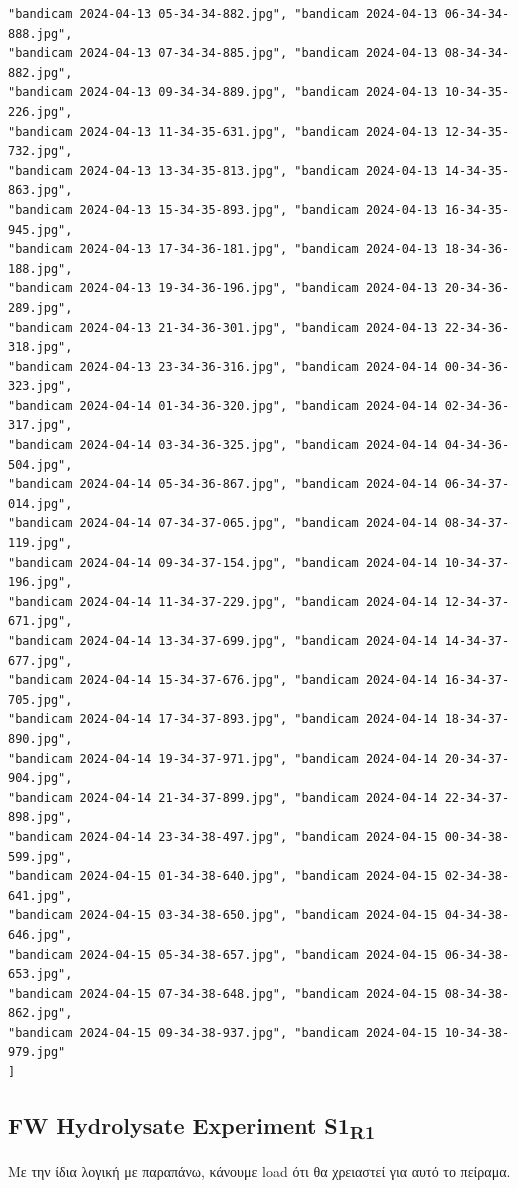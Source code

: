 \documentclass[11pt]{article}
\begin{document}
\begin{verbatim}
"bandicam 2024-04-13 05-34-34-882.jpg", "bandicam 2024-04-13 06-34-34-888.jpg",
"bandicam 2024-04-13 07-34-34-885.jpg", "bandicam 2024-04-13 08-34-34-882.jpg",
"bandicam 2024-04-13 09-34-34-889.jpg", "bandicam 2024-04-13 10-34-35-226.jpg",
"bandicam 2024-04-13 11-34-35-631.jpg", "bandicam 2024-04-13 12-34-35-732.jpg",
"bandicam 2024-04-13 13-34-35-813.jpg", "bandicam 2024-04-13 14-34-35-863.jpg",
"bandicam 2024-04-13 15-34-35-893.jpg", "bandicam 2024-04-13 16-34-35-945.jpg",
"bandicam 2024-04-13 17-34-36-181.jpg", "bandicam 2024-04-13 18-34-36-188.jpg",
"bandicam 2024-04-13 19-34-36-196.jpg", "bandicam 2024-04-13 20-34-36-289.jpg",
"bandicam 2024-04-13 21-34-36-301.jpg", "bandicam 2024-04-13 22-34-36-318.jpg",
"bandicam 2024-04-13 23-34-36-316.jpg", "bandicam 2024-04-14 00-34-36-323.jpg",
"bandicam 2024-04-14 01-34-36-320.jpg", "bandicam 2024-04-14 02-34-36-317.jpg",
"bandicam 2024-04-14 03-34-36-325.jpg", "bandicam 2024-04-14 04-34-36-504.jpg",
"bandicam 2024-04-14 05-34-36-867.jpg", "bandicam 2024-04-14 06-34-37-014.jpg",
"bandicam 2024-04-14 07-34-37-065.jpg", "bandicam 2024-04-14 08-34-37-119.jpg",
"bandicam 2024-04-14 09-34-37-154.jpg", "bandicam 2024-04-14 10-34-37-196.jpg",
"bandicam 2024-04-14 11-34-37-229.jpg", "bandicam 2024-04-14 12-34-37-671.jpg",
"bandicam 2024-04-14 13-34-37-699.jpg", "bandicam 2024-04-14 14-34-37-677.jpg",
"bandicam 2024-04-14 15-34-37-676.jpg", "bandicam 2024-04-14 16-34-37-705.jpg",
"bandicam 2024-04-14 17-34-37-893.jpg", "bandicam 2024-04-14 18-34-37-890.jpg",
"bandicam 2024-04-14 19-34-37-971.jpg", "bandicam 2024-04-14 20-34-37-904.jpg",
"bandicam 2024-04-14 21-34-37-899.jpg", "bandicam 2024-04-14 22-34-37-898.jpg",
"bandicam 2024-04-14 23-34-38-497.jpg", "bandicam 2024-04-15 00-34-38-599.jpg",
"bandicam 2024-04-15 01-34-38-640.jpg", "bandicam 2024-04-15 02-34-38-641.jpg",
"bandicam 2024-04-15 03-34-38-650.jpg", "bandicam 2024-04-15 04-34-38-646.jpg",
"bandicam 2024-04-15 05-34-38-657.jpg", "bandicam 2024-04-15 06-34-38-653.jpg",
"bandicam 2024-04-15 07-34-38-648.jpg", "bandicam 2024-04-15 08-34-38-862.jpg",
"bandicam 2024-04-15 09-34-38-937.jpg", "bandicam 2024-04-15 10-34-38-979.jpg"
]
\end{verbatim}

\subsection{FW Hydrolysate Experiment S1\textsubscript{R1}}
\label{sec:org6f73ce8}
Με την ίδια λογική με παραπάνω, κάνουμε load ότι θα χρειαστεί για αυτό το πείραμα.
\end{document}
